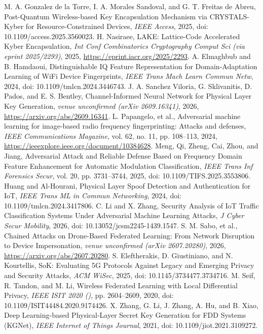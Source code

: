 M. A. Gonzalez de la Torre, I. A. Morales Sandoval, and G. T. Freitas de Abreu, Post-Quantum Wireless-based Key Encapsulation Mechanism via CRYSTALS-Kyber for Resource-Constrained Devices, \emph{IEEE Access}, 2025, doi: 10.1109/access.2025.3560023.
H. Nasiraee, LAKE: Lattice-Code Accelerated Kyber Encapsulation, \emph{Int Conf Combinatorics Cryptography Comput Sci (via eprint 2025/2293)}, 2025, \url{https://eprint.iacr.org/2025/2293}.
A. Elmaghbub and B. Hamdaoui, Distinguishable IQ Feature Representation for Domain-Adaptation Learning of WiFi Device Fingerprints, \emph{IEEE Trans Mach Learn Commun Netw}, 2024, doi: 10.1109/tmlcn.2024.3446743.
J. A. Sanchez Viloria, G. Sklivanitis, D. Pados, and E. S. Bentley, Channel-Informed Neural Network for Physical Layer Key Generation, \emph{venue unconfirmed (arXiv 2609.16341)}, 2026, \url{https://arxiv.org/abs/2609.16341}.
L. Papangelo, et al., Adversarial machine learning for image-based radio frequency fingerprinting: Attacks and defenses, \emph{IEEE Communications Magazine}, vol. 62, no. 11, pp. 108--113, 2024, \url{https://ieeexplore.ieee.org/document/10384628}.
Meng, Qi, Zheng, Cai, Zhou, and Jiang, Adversarial Attack and Reliable Defense Based on Frequency Domain Feature Enhancement for Automatic Modulation Classification, \emph{IEEE Trans Inf Forensics Secur}, vol. 20, pp. 3731--3744, 2025, doi: 10.1109/TIFS.2025.3553806.
Huang and Al-Hourani, Physical Layer Spoof Detection and Authentication for IoT, \emph{IEEE Trans ML in Commun Networking}, 2024, doi: 10.1109/tmlcn.2024.3417806.
C. Li and X. Zhang, Security Analysis of IoT Traffic Classification Systems Under Adversarial Machine Learning Attacks, \emph{J Cyber Secur Mobility}, 2026, doi: 10.13052/jcsm2245-1439.1547.
S. M. Sabo, et al., Chained Attacks on Drone-Based Federated Learning: From Network Disruption to Device Impersonation, \emph{venue unconfirmed (arXiv 2607.20280)}, 2026, \url{https://arxiv.org/abs/2607.20280}.
S. Eleftherakis, D. Giustiniano, and N. Kourtellis, SoK: Evaluating 5G Protocols Against Legacy and Emerging Privacy and Security Attacks, \emph{ACM WiSec}, 2025, doi: 10.1145/3734477.3734716.
M. Seif, R. Tandon, and M. Li, Wireless Federated Learning with Local Differential Privacy, \emph{IEEE ISIT 2020 ()}, pp. 2604--2609, 2020, doi: 10.1109/ISIT44484.2020.9174426.
X. Zhang, G. Li, J. Zhang, A. Hu, and B. Xiao, Deep Learning-based Physical-Layer Secret Key Generation for FDD Systems (KGNet), \emph{IEEE Internet of Things Journal}, 2021, doi: 10.1109/jiot.2021.3109272.
